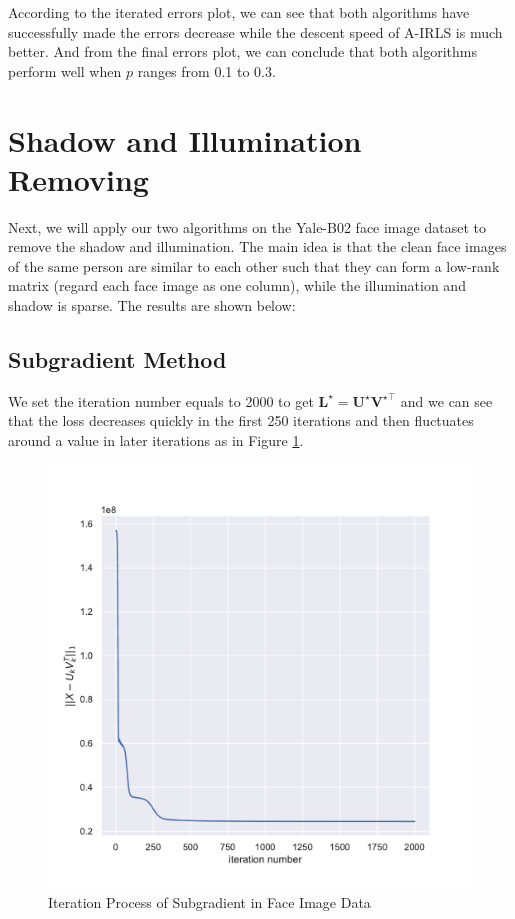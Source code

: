 \documentclass[conference]{IEEEtran}
\begin{document}
According to the iterated errors plot, we can see that both algorithms have successfully made the errors decrease while the descent speed of A-IRLS is much better. And from the final errors plot, we can conclude that both algorithms perform well when $p$ ranges from 0.1 to 0.3.

\section{Shadow and Illumination Removing}
Next, we will apply our two algorithms on the Yale-B02 face image dataset to remove the shadow and illumination. The main idea is that the clean face images of the same person are similar to each other such that they can form a low-rank matrix (regard each face image as one column), while the illumination and shadow is sparse. The results are shown below:

\subsection{Subgradient Method}
We set the iteration number equals to 2000 to get $\boldsymbol{L}^{\star}=\boldsymbol{U}^{\star}\boldsymbol{V}^{\star\top}$ and we can see that the loss decreases quickly in the first 250 iterations and then fluctuates around a value in later iterations as in Figure \ref{sub_face}.

\begin{figure}[htbp]
	\centering
	\includegraphics[width=0.6\linewidth]{image/Figure 5 Subgradient}
	\caption{Iteration Process of Subgradient in Face Image Data}
	\label{sub_face}
\end{figure}
\end{document}
